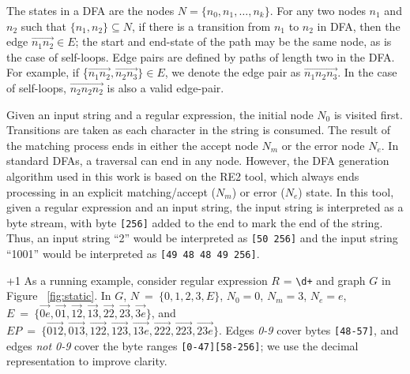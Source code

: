 The states in a DFA are the nodes $N = \{n_0, n_1, \dots, n_k\}$. 
For any two nodes $n_1$ and $n_2$ such that $\{n_1, n_2\} \subseteq N$, if there is a transition from $n_1$ to $n_2$ in DFA, then the edge $\overrightarrow{n_1n_2} \in E$;  the start and end-state of the path may be the same node, as is the case of self-loops. 
Edge pairs are defined by paths of length two in the DFA.
For example,  if \{$\overrightarrow{n_1n_2}, \overrightarrow{n_2n_3}\} \in E$,  we denote the edge pair as $\overrightarrow{n_1n_2n_3}$.
In the case of self-loops, $\overrightarrow{n_2n_2n_2}$ is also a valid edge-pair. %

Given an input string and a regular expression, the initial node $N_0$ is visited first. Transitions are taken as each character in the string is consumed. The result of the matching process ends in either the accept node $N_m$ or the error node $N_e$. 
In standard DFAs, a traversal can end in any node. However, the DFA generation algorithm used in this work is based on the RE2 tool, which always ends processing in an explicit matching/accept ($N_m$) or error ($N_e$) state.
In this tool, given a regular expression and an input string, the input string is interpreted as a byte stream, with byte {\tt [256]} added to the end to mark the end of the string. Thus, an input string ``2'' would be interpreted as {\tt [50 256]} and the input string ``1001'' would be interpreted as {\tt [49 48 48 49 256]}. 

\looseness +1
As a running example, consider regular expression  $R$ = \verb!\d+! and graph $G$  in Figure ~\ref{fig:static}. %
In $G$, $N~=~\{0, 1, 2, 3, E\}$, $N_0 = 0$, $N_m = 3$, $N_e = e$, 
$E~=~\{\overrightarrow{0e}, \overrightarrow{01}, \overrightarrow{12}, \overrightarrow{13}, \overrightarrow{22}, \overrightarrow{23}, \overrightarrow{3e}\}$, and\\ 
$EP~=~\{\overrightarrow{012}, \overrightarrow{013}, \overrightarrow{122}, \overrightarrow{123},
\overrightarrow{13e}, \overrightarrow{222}, \overrightarrow{223}, \overrightarrow{23e}\}$.  Edges \emph{0-9} cover bytes {\tt [48-57]}, and edges \emph{not 0-9} cover the byte ranges {\tt [0-47][58-256]}; we use the decimal representation to improve clarity. 



